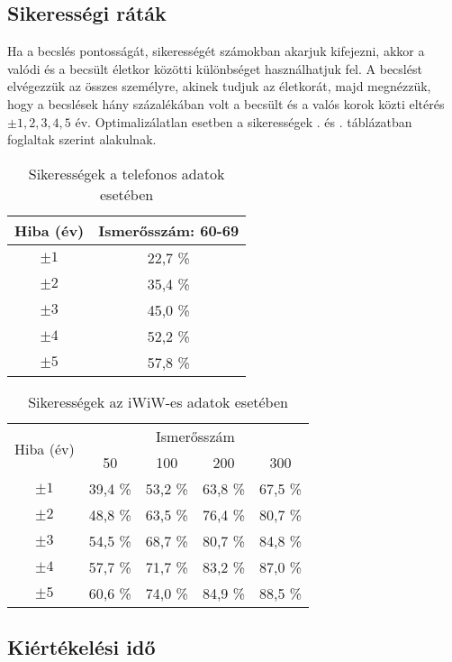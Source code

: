 \documentclass[12pt]{article}
\begin{document}
\subsection{Sikerességi ráták}
Ha a becslés pontosságát, sikerességét számokban akarjuk kifejezni, akkor a valódi és a becsült életkor közötti különbséget használhatjuk fel. A becslést elvégezzük az összes személyre, akinek tudjuk az életkorát, majd megnézzük, hogy a becslések hány százalékában volt a becsült és a valós korok közti eltérés $\pm 1, 2,3,4,5$ év. Optimalizálatlan esetben a sikerességek . és . táblázatban foglaltak szerint alakulnak.
\begin{table}[H]
	\centering
	\begin{tabular}{|c|c|}
		\hline
		Hiba (év) & Ismerősszám: 60-69 \\
		\hline
		$\pm 1$ & 22,7 \% \\
		\hline
		$\pm 2$ & 35,4 \% \\
		\hline
		$\pm 3$ & 45,0 \% \\
		\hline
		$\pm 4$ & 52,2 \% \\
		\hline
		$\pm 5$ & 57,8 \% \\
		\hline
	\end{tabular}
	\caption{Sikerességek a telefonos adatok esetében}
	\label{telefon_sikeresseg_nemopt}
\end{table}
\begin{table}[H]
	\centering
	\begin{tabular}{|c|c|c|c|c|}
		\hline
		\multirow{2}{*}{Hiba (év)} & \multicolumn{4}{|c|}{Ismerősszám} \\ \cline{2-5} & 50 & 100 & 200 & 300 \\
		\hline
		$\pm 1$ & 39,4 \% & 53,2 \% & 63,8 \% & 67,5 \% \\
		\hline
		$\pm 2$ & 48,8 \% & 63,5 \% & 76,4 \% & 80,7 \% \\
		\hline
		$\pm 3$ & 54,5 \% & 68,7 \% & 80,7 \% & 84,8 \% \\
		\hline
		$\pm 4$ & 57,7 \% & 71,7 \% & 83,2 \% & 87,0 \% \\
		\hline
		$\pm 5$ & 60,6 \% & 74,0 \% & 84,9 \% & 88,5 \% \\
		\hline
	\end{tabular}
	\caption{Sikerességek az iWiW-es adatok esetében}
	\label{iwiw_sikeresseg_nemopt}
\end{table}

\subsection{Kiértékelési idő}
\end{document}
